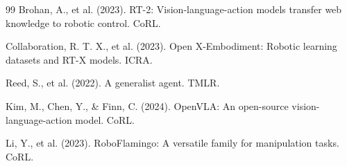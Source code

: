 \documentclass[10pt,twocolumn]{article}
\begin{document}
\begin{thebibliography}{99}
Brohan, A., et al. (2023). RT-2: Vision-language-action models transfer web knowledge to robotic control. CoRL.

Collaboration, R. T. X., et al. (2023). Open X-Embodiment: Robotic learning datasets and RT-X models. ICRA.

Reed, S., et al. (2022). A generalist agent. TMLR.

Kim, M., Chen, Y., \& Finn, C. (2024). OpenVLA: An open-source vision-language-action model. CoRL.

Li, Y., et al. (2023). RoboFlamingo: A versatile family for manipulation tasks. CoRL.
\end{thebibliography}
\end{document}
